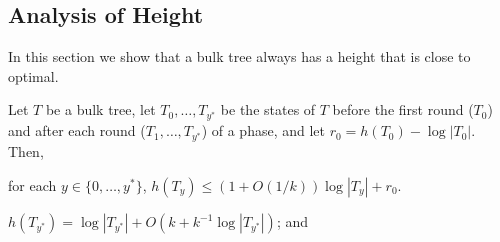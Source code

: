 \documentclass[kpfonts]{patmorin}
\begin{document}
\subsection{Analysis of Height}

In this section we show that a bulk tree always has a height that is close to optimal.

\begin{lem}
  Let $T$ be a bulk tree, let $T_0,\ldots,T_{y^*}$ be the states of $T$ before the first round ($T_0$) and after each round ($T_1,\ldots,T_{y^*}$) of a phase, and let $r_0=h(T_0)-\log|T_0|$.  Then,
  \begin{compactenum}[(i)]
    \item for each $y\in\{0,\ldots,y^*\}$, $h(T_y)\le (1+O(1/k))\log|T_y| + r_0$.
    \item $h(T_{y^*}) = \log|T_{y^*}|+O(k+k^{-1}\log|T_{y^*}|)$; and 
  \end{compactenum}
\end{lem}
\end{document}
